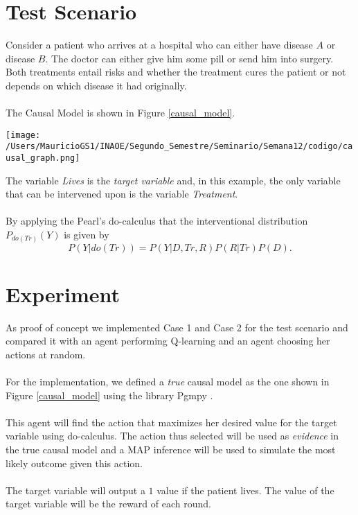 \documentclass[a0,portrait]{a0poster}
\begin{document}
\begin{multicols}{3}


\section{Test Scenario}
Consider a patient who arrives at a hospital who can either have disease $A$ or disease $B$. The doctor can either give him some pill or send him into surgery.  Both treatments entail risks and whether the treatment cures the patient or not depends on which disease it had originally.\\
\\
The Causal Model is shown in Figure \ref{causal_model}.
\begin{center}
\centerline{\texttt{[image: /Users/MauricioGS1/INAOE/Segundo\_Semestre/Seminario/Semana12/codigo/causal\_graph.png]}}
\label{causal_model}
\end{center}

The variable \textit{Lives} is the \textit{target variable} and, in this example, the only variable that can be intervened upon is the variable \textit{Treatment}. \\
\\
By applying the Pearl's do-calculus that the interventional distribution $P_{do(Tr)}(Y)$ is given by
\[ P(Y | do(Tr))=P(Y | D, Tr, R)P(R | Tr) P(D). \]


\section*{Experiment}
As proof of concept we implemented  Case 1 and Case 2 for the test scenario and compared it with an agent performing Q-learning \cite{watkins1992q} and an agent choosing her actions at random.\\
\\
For the implementation, we defined a \textit{true} causal model as the one shown in Figure \ref{causal_model} using the library Pgmpy \cite{ankan2015pgmpy}.\\
\\
This agent will find the action that maximizes her desired value for the target variable using do-calculus. The action thus selected will be used as \textit{evidence} in the true causal model and a MAP inference will be used to simulate the most likely outcome given this action. \\
\\
The target variable will output a $1$ value if the patient lives. The value of the target variable will be the reward of each round.

\end{multicols}
\end{document}
